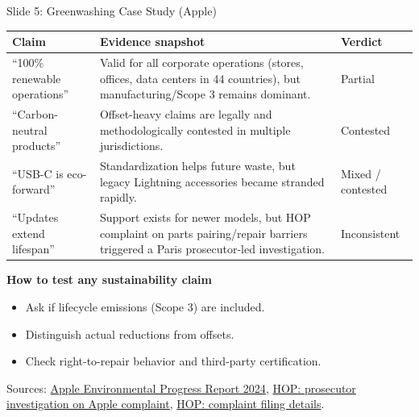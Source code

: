 \documentclass[aspectratio=169]{beamer}
\begin{document}
\begin{frame}{Slide 5: Greenwashing Case Study (Apple)}
\scriptsize
\begin{tabular}{p{2.5cm}p{5.6cm}p{2.2cm}}
\toprule
Claim & Evidence snapshot & Verdict \\
\midrule
``100\% renewable operations'' & Valid for all corporate operations (stores, offices, data centers in 44 countries), but manufacturing/Scope 3 remains dominant. & Partial \\
``Carbon-neutral products'' & Offset-heavy claims are legally and methodologically contested in multiple jurisdictions. & Contested \\
``USB-C is eco-forward'' & Standardization helps future waste, but legacy Lightning accessories became stranded rapidly. & Mixed / contested \\
``Updates extend lifespan'' & Support exists for newer models, but HOP complaint on parts pairing/repair barriers triggered a Paris prosecutor-led investigation. & Inconsistent \\
\bottomrule
\end{tabular}

\vspace{0.15cm}
\textbf{How to test any sustainability claim}
\begin{itemize}
  \item Ask if lifecycle emissions (Scope 3) are included.
  \item Distinguish actual reductions from offsets.
  \item Check right-to-repair behavior and third-party certification.
\end{itemize}
\vspace{0.05cm}
\tiny Sources: \href{https://www.apple.com/environment/pdf/Apple_Environmental_Progress_Report_2024.pdf}{Apple Environmental Progress Report 2024}, \href{https://www.halteobsolescence.org/plainte-contre-apple-le-procureur-de-la-republique-ouvre-lenquete/}{HOP: prosecutor investigation on Apple complaint}, \href{https://www.halteobsolescence.org/nouvelle-plainte-de-hop-contre-apple-pour-obsolescence-programmee-et-entraves-a-la-reparation/}{HOP: complaint filing details}.
\end{frame}

\end{document}
